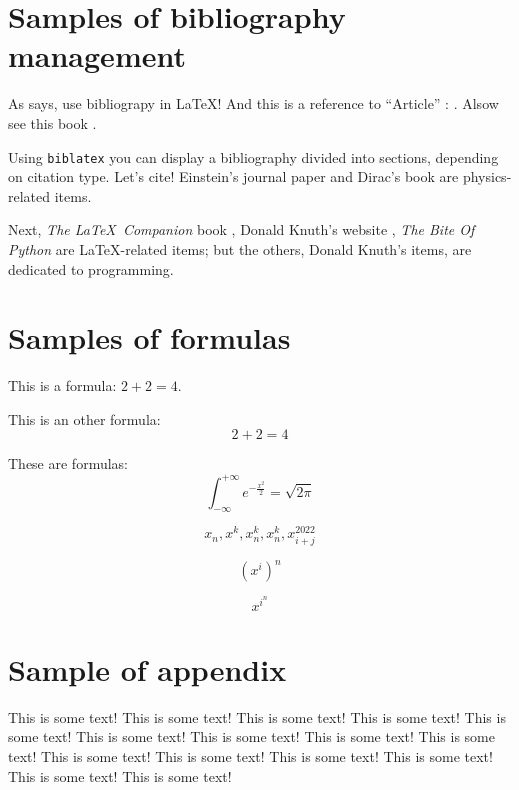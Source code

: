 \section{Samples of bibliography management}
As \parencite{example_book} says, use bibliograpy in \LaTeX{}! And this is a reference to ``Article'' : \parencite{example_article}. Alsow see this book \parencite{example_incollection}.

Using \texttt{biblatex} you can display a bibliography divided into sections, depending on citation type.  Let's cite! Einstein's journal paper \parencite{example_article} and Dirac's book \parencite{example_book} are physics-related items.

Next, \textit{The \LaTeX\ Companion} book \parencite{example_book}, Donald Knuth's website \parencite{example_online}, \textit{The Bite Of Python} \parencite{byteofpython} are \LaTeX-related items; but the others, Donald Knuth's items, \cite{example_inbook} are dedicated to programming.

\section{Samples of formulas}
This is a formula: $2 + 2 = 4$.

This is an other formula:
\[2 + 2 = 4\]

These are formulas:
\[\int_{-\infty}^{+\infty} e^{-\frac{x^2}{2}} = \sqrt{2 \pi}\]

\[x_n, x^k, x_n^k, x^k_n, x_{i + j}^{2022}\]

\[(x^i)^n\]

\[x^{i^n}\]

\newpage
\listoftables
\listoffigures
\printbibliography

\newpage
\appendix
\section{Sample of appendix}
This is some text! This is some text! This is some text! This is some text! This is some text! This is some text! This is some text! This is some text! This is some text! This is some text! This is some text! This is some text! This is some text! This is some text! This is some text!


